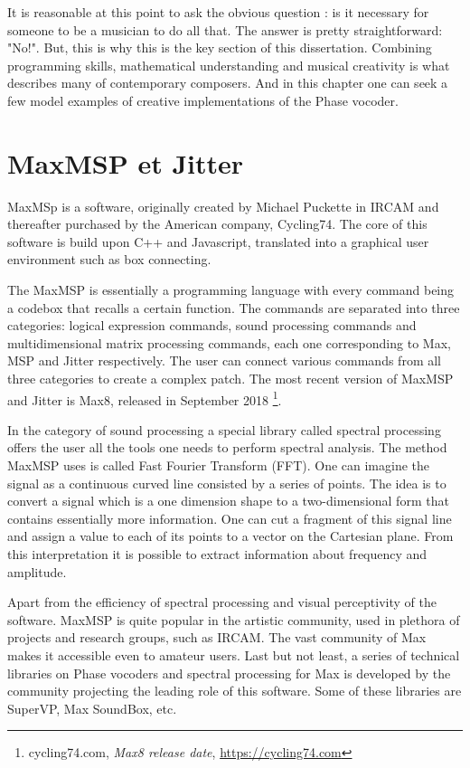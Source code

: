 It is reasonable at this point to ask the obvious question : is it necessary for someone to be a musician to do all that. The answer is pretty straightforward: "No!". But, this is why this is the key section of this dissertation. Combining programming skills, mathematical understanding and musical creativity is what describes many of contemporary composers. And in this chapter one can seek a few model examples of creative implementations of the Phase vocoder.
  


\section{MaxMSP et Jitter}

MaxMSp is a software, originally created by Michael Puckette in IRCAM and thereafter purchased by the American company, Cycling74. The core of this software is build upon C++ and Javascript, translated into a graphical user environment such as box connecting.

The MaxMSP is essentially a programming language with every command being a codebox that recalls a certain function. The commands are separated into three categories: logical expression commands, sound processing commands and multidimensional matrix processing commands, each one corresponding to Max, MSP and Jitter respectively. The user can connect various commands from all three categories to create a complex patch. The most recent version of MaxMSP and Jitter is Max8, released in September 2018 \footnote{cycling74.com, \textit{Max8 release date}, \href{https://cycling74.com}{https://cycling74.com} \nocite{cycling74}}.

In the category of sound processing a special library called spectral processing offers the user all the tools one needs to perform spectral analysis. The method MaxMSP uses is called Fast Fourier Transform (FFT). One can imagine the signal as a continuous curved line consisted by a series of points. The idea is to convert a signal which is a one dimension shape to a two-dimensional form that contains essentially more information. One can cut a fragment of this signal line and assign a value to each of its points to a vector on the Cartesian plane. From this interpretation it is possible to extract information about frequency and amplitude.

Apart from the efficiency of spectral processing and visual perceptivity of the software. MaxMSP is quite popular in the artistic community, used in plethora of projects and research groups, such as IRCAM. The vast community of Max makes it accessible even to amateur users. Last but not least, a series of technical libraries on Phase vocoders and spectral processing for Max is developed by the community projecting the leading role of this software. Some of these libraries are SuperVP, Max SoundBox, etc. 



